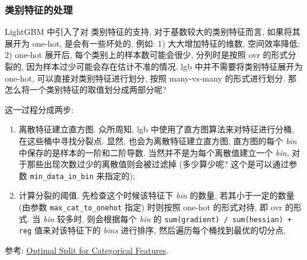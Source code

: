\subsubsection{类别特征的处理}
LightGBM 中引入了对 类别特征的支持, 对于基数较大的类别特征而言, 如果将其展开为 one-hot, 是会有一些坏处的, 例如: 1) 大大增加特征的维数, 空间效率降低; 2) one-hot 展开后, 每个类别上的样本数可能会很少, 分列时是按照 ovr 的形式分裂的, 因为样本过少可能会存在估计不准的情况. lgb 中并不需要将类别特征展开为 one-hot, 可以直接对类别特征进行划分, 按照 many-vs-many 的形式进行划分. 那怎么将一个类别特征的取值划分成两部分呢?

这一过程分成两步:
\begin{enumerate}
	\item 离散特征建立直方图. 众所周知, lgb 中使用了直方图算法来对特征进行分桶, 在这些桶中寻找分裂点. 显然, 也会为离散特征建立直方图, 直方图的每个 \textit{bin} 中保存的是样本的一阶和二阶导数. 当然并不是为每个离散值建立一个 \textit{bin}, 对于那些出现次数过少的离散值则会被过滤掉 (多少算少呢? 这个是可以通过参数 \texttt{min_data_in_bin} 来指定的);
	
	\item 计算分裂的阈值. 先检查这个时候该特征下 \textit{bin} 的数量, 若其小于一定的数量 (由参数 \texttt{max_cat_to_onehot} 指定) 时则按照 one-hot 的形式对待, 即 ovr 的形式. 当 \textit{bin} 较多时, 则会根据每个 \textit{bin} 的 \texttt{sum(gradient) / sum(hessian) + reg} 值来对该特征下的 \textit{bins} 进行排序, 然后遍历每个桶找到最优的切分点.
\end{enumerate}

参考: \href{https://lightgbm.readthedocs.io/en/latest/Features.html#optimal-split-for-categorical-features}{Optimal Split for Categorical Features}.
